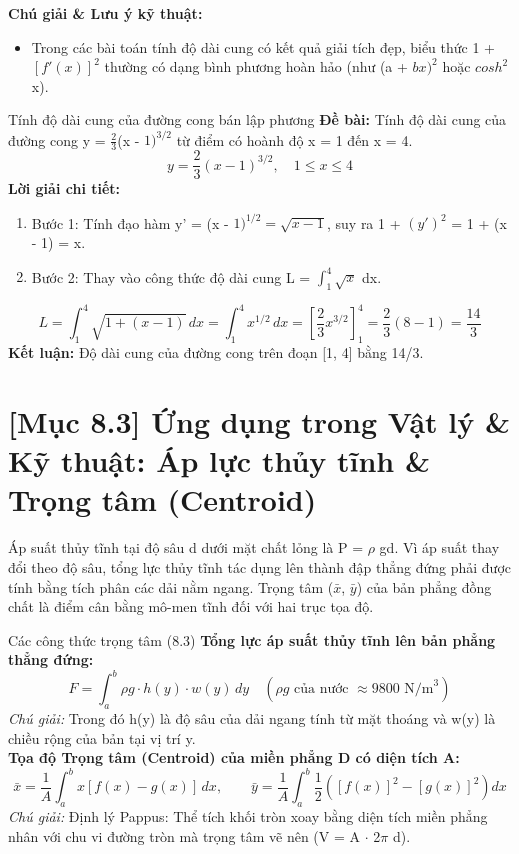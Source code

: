 \documentclass[11pt,a4paper,oneside]{book}
\begin{document}
\noindent\textbf{Chú giải \& Lưu ý kỹ thuật:}
\begin{itemize}[leftmargin=1.5em, itemsep=2pt]
  \item Trong các bài toán tính độ dài cung có kết quả giải tích đẹp, biểu thức 1 + $[f'(x)]^2$ thường có dạng bình phương hoàn hảo (như (a + $bx)^2$ hoặc $cosh^2$ x).
\end{itemize}

\begin{vidu}{Tính độ dài cung của đường cong bán lập phương}
\textbf{Đề bài:} Tính độ dài cung của đường cong y = $\frac{2}{3}$(x - $1)^{3/2}$ từ điểm có hoành độ x = 1 đến x = 4.
\[ y = \frac{2}{3}(x - 1)^{3/2}, \quad 1 \le x \le 4 \]
\textbf{Lời giải chi tiết:}
\begin{enumerate}[leftmargin=1.5em, itemsep=2pt]
  \item Bước 1: Tính đạo hàm y' = (x - $1)^{1/2} = \sqrt{x - 1}$, suy ra 1 + $(y')^2$ = 1 + (x - 1) = x.
  \item Bước 2: Thay vào công thức độ dài cung L = $\int_1^4 \sqrt{x}$ dx.
\end{enumerate}
\[ L = \int_1^4 \sqrt{1 + (x - 1)}\,dx = \int_1^4 x^{1/2}\,dx = \left[\frac{2}{3}x^{3/2}\right]_1^4 = \frac{2}{3}(8 - 1) = \frac{14}{3} \]
\noindent\textbf{Kết luận:} Độ dài cung của đường cong trên đoạn [1, 4] bằng 14/3.
\end{vidu}

\section{[Mục 8.3] Ứng dụng trong Vật lý \& Kỹ thuật: Áp lực thủy tĩnh \& Trọng tâm (Centroid)}
Áp suất thủy tĩnh tại độ sâu d dưới mặt chất lỏng là P = $\rho$ gd. Vì áp suất thay đổi theo độ sâu, tổng lực thủy tĩnh tác dụng lên thành đập thẳng đứng phải được tính bằng tích phân các dải nằm ngang. Trọng tâm ($\bar{x}$, $\bar{y}$) của bản phẳng đồng chất là điểm cân bằng mô-men tĩnh đối với hai trục tọa độ.

\begin{congthuc}{Các công thức trọng tâm (8.3)}
\noindent\textbf{Tổng lực áp suất thủy tĩnh lên bản phẳng thẳng đứng:}
\[ F = \int_a^b \rho g \cdot h(y) \cdot w(y)\,dy \quad (\rho g \text{ của nước } \approx 9800 \text{ N/m}^3) \]
\noindent\textit{Chú giải:} Trong đó h(y) là độ sâu của dải ngang tính từ mặt thoáng và w(y) là chiều rộng của bản tại vị trí y.\\[4pt]
\noindent\textbf{Tọa độ Trọng tâm (Centroid) của miền phẳng D có diện tích A:}
\[ \bar{x} = \frac{1}{A} \int_a^b x[f(x) - g(x)]\,dx, \qquad \bar{y} = \frac{1}{A} \int_a^b \frac{1}{2}\left([f(x)]^2 - [g(x)]^2\right) dx \]
\noindent\textit{Chú giải:} Định lý Pappus: Thể tích khối tròn xoay bằng diện tích miền phẳng nhân với chu vi đường tròn mà trọng tâm vẽ nên (V = A $\cdot$  2$\pi$ d).\\[4pt]
\end{congthuc}
\end{document}
